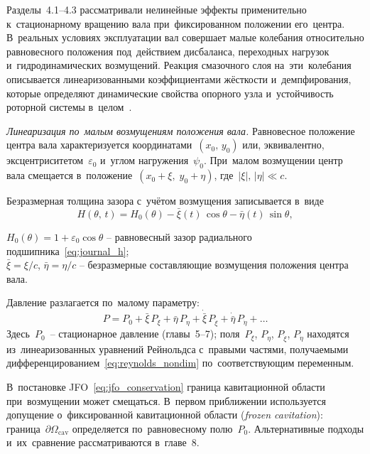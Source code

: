 
Разделы~4.1--4.3 рассматривали нелинейные эффекты применительно к~стационарному вращению вала при~фиксированном положении его~центра. В~реальных условиях эксплуатации вал совершает малые колебания относительно равновесного положения под~действием дисбаланса, переходных нагрузок и~гидродинамических возмущений. Реакция смазочного слоя на~эти~колебания описывается линеаризованными коэффициентами жёсткости и~демпфирования, которые определяют динамические свойства опорного узла и~устойчивость роторной системы в~целом~\cite{goodwin1997,jang1999,sayed2022,muszynska1988,weissbacher2014}.

\textit{Линеаризация по~малым возмущениям положения вала.}
Равновесное положение центра вала характеризуется координатами~$(x_0,\,y_0)$ или, эквивалентно, эксцентриситетом~$\varepsilon_0$ и~углом нагружения~$\psi_0$. При~малом возмущении центр вала смещается в~положение~$(x_0 + \xi,\; y_0 + \eta)$, где~$|\xi|,\,|\eta| \ll c$.

Безразмерная толщина зазора с~учётом возмущения записывается в~виде
\begin{equation}
  H(\theta,\,t) = H_0(\theta)
    - \bar{\xi}(t)\,\cos\theta
    - \bar{\eta}(t)\,\sin\theta,
  \label{eq:H_perturbed}
\end{equation}
\begin{conditions}
$H_0(\theta) = 1 + \varepsilon_0\cos\theta$ -- равновесный зазор радиального подшипника~\eqref{eq:journal_h};\\
$\bar{\xi} = \xi/c$,\; $\bar{\eta} = \eta/c$ -- безразмерные составляющие возмущения положения центра вала.
\end{conditions}
Давление разлагается по~малому параметру:
\begin{equation}
  P = P_0
    + \bar{\xi}\,P_{\xi}
    + \bar{\eta}\,P_{\eta}
    + \dot{\bar{\xi}}\,P_{\dot\xi}
    + \dot{\bar{\eta}}\,P_{\dot\eta}
    + \ldots
  \label{eq:P_expansion}
\end{equation}
Здесь~$P_0$~-- стационарное давление (главы~5--7); поля~$P_{\xi}$, $P_{\eta}$, $P_{\dot\xi}$, $P_{\dot\eta}$ находятся из~линеаризованных уравнений Рейнольдса с~правыми частями, получаемыми дифференцированием~\eqref{eq:reynolds_nondim} по~соответствующим переменным.

В~постановке JFO~\eqref{eq:jfo_conservation} граница кавитационной области при~возмущении может смещаться. В~первом приближении используется допущение о~фиксированной кавитационной области (\textit{frozen cavitation}): граница~$\partial\Omega_{\mathrm{cav}}$ определяется по~равновесному полю~$P_0$. Альтернативные подходы и~их~сравнение рассматриваются в~главе~8.


